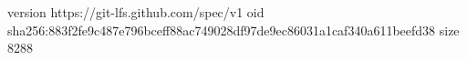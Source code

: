 version https://git-lfs.github.com/spec/v1
oid sha256:883f2fe9c487e796bceff88ac749028df97de9ec86031a1caf340a611beefd38
size 8288
